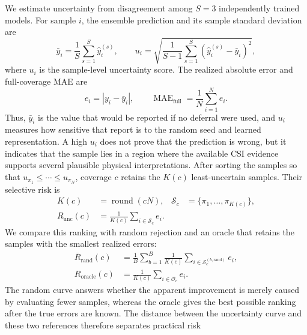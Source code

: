 We estimate uncertainty from disagreement among \(S=3\) independently trained models. For sample
\(i\), the ensemble prediction and its sample standard deviation are
\begin{equation}
\bar y_i=\frac{1}{S}\sum_{s=1}^{S}\hat y_i^{(s)},\qquad
u_i=\sqrt{\frac{1}{S-1}\sum_{s=1}^{S}
\left(\hat y_i^{(s)}-\bar y_i\right)^2},
\label{eq:ensemble-uncertainty}
\end{equation}
where \(u_i\) is the sample-level uncertainty score. The realized absolute error and full-coverage
MAE are
\begin{equation}
e_i=|y_i-\bar y_i|,\qquad
\operatorname{MAE}_{\mathrm{full}}=\frac{1}{N}\sum_{i=1}^{N}e_i.
\label{eq:full-coverage-error}
\end{equation}
Thus, \(\bar y_i\) is the value that would be reported if no deferral were used, and \(u_i\) measures
how sensitive that report is to the random seed and learned representation. A high \(u_i\) does not
prove that the prediction is wrong, but it indicates that the sample lies in a region where the
available CSI evidence supports several plausible physical interpretations.
After sorting the samples so that \(u_{\pi_1}\leq\cdots\leq u_{\pi_N}\), coverage \(c\) retains the
\(K(c)\) least-uncertain samples. Their selective risk is
\begin{equation}
\begin{aligned}
K(c)&=\operatorname{round}(cN),&
\mathcal S_c&=\{\pi_1,\ldots,\pi_{K(c)}\},\\
R_{\mathrm{unc}}(c)&=\frac{1}{K(c)}\sum_{i\in\mathcal S_c}e_i.
\end{aligned}
\label{eq:selective-risk}
\end{equation}
We compare this ranking with random rejection and an oracle that retains the samples with the
smallest realized errors:
\begin{equation}
\begin{aligned}
\bar R_{\mathrm{rand}}(c)
&=\frac{1}{B}\sum_{b=1}^{B}\frac{1}{K(c)}
\sum_{i\in\mathcal S_c^{(b,\mathrm{rand})}}e_i,\\
R_{\mathrm{oracle}}(c)&=\frac{1}{K(c)}\sum_{i\in\mathcal O_c}e_i.
\end{aligned}
\label{eq:selective-references}
\end{equation}
The random curve answers whether the apparent improvement is merely caused by evaluating fewer
samples, whereas the oracle gives the best possible ranking after the true errors are known. The
distance between the uncertainty curve and these two references therefore separates practical risk
